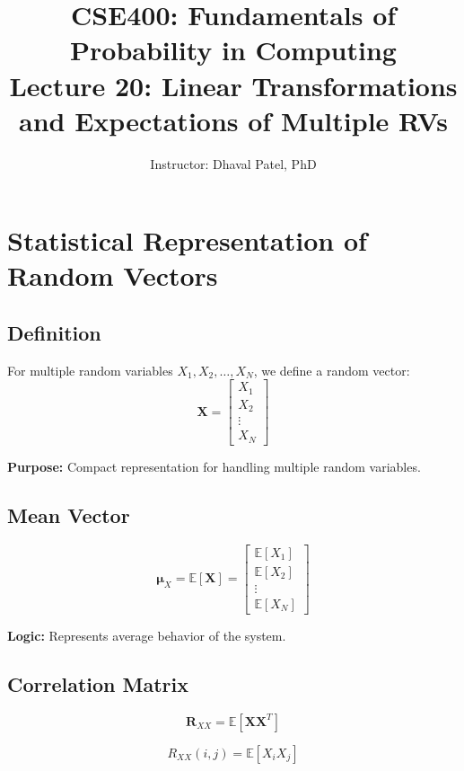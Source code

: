 \documentclass[11pt]{article}
\title{\textbf{CSE400: Fundamentals of Probability in Computing}\\
Lecture 20: Linear Transformations and Expectations of Multiple RVs}
\author{Instructor: Dhaval Patel, PhD}
\date{}
\begin{document}
\maketitle

\section{Statistical Representation of Random Vectors}

\subsection{Definition}
For multiple random variables $X_1, X_2, \dots, X_N$, we define a random vector:
\begin{equation}
\mathbf{X} =
\begin{bmatrix}
X_1 \\
X_2 \\
\vdots \\
X_N
\end{bmatrix}
\end{equation}

\textbf{Purpose:} Compact representation for handling multiple random variables.

\subsection{Mean Vector}
\begin{equation}
\boldsymbol{\mu}_X = \mathbb{E}[\mathbf{X}]
=
\begin{bmatrix}
\mathbb{E}[X_1] \\
\mathbb{E}[X_2] \\
\vdots \\
\mathbb{E}[X_N]
\end{bmatrix}
\end{equation}

\textbf{Logic:} Represents average behavior of the system.

\subsection{Correlation Matrix}
\begin{equation}
\mathbf{R}_{XX} = \mathbb{E}[\mathbf{X}\mathbf{X}^T]
\end{equation}

\begin{equation}
R_{XX}(i,j) = \mathbb{E}[X_i X_j]
\end{equation}
\end{document}
